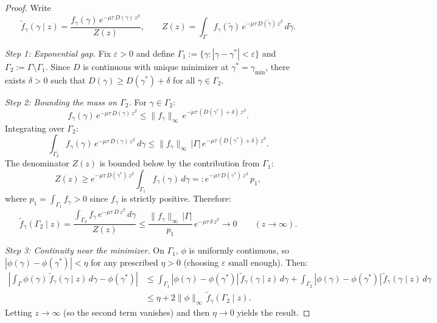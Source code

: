 \documentclass[12pt,a4paper]{article}
\theoremstyle{definition}
\theoremstyle{plain}
\theoremstyle{remark}
\begin{document}
\begin{proof}
Write
\[
  \widetilde{f}_{\gamma}(\gamma \mid z) = \frac{f_{\gamma}(\gamma)\,e^{-\mu\tau\,D(\gamma)\,z^{\beta}}}{Z(z)}, \qquad Z(z) = \int_{\Gamma} f_{\gamma}(\tilde\gamma)\,e^{-\mu\tau\,D(\tilde\gamma)\,z^{\beta}}\,d\tilde\gamma.
\]

\emph{Step 1: Exponential gap.}  Fix $\varepsilon > 0$ and define $\Gamma_1 := \{\gamma : |\gamma - \gamma^*| < \varepsilon\}$ and $\Gamma_2 := \Gamma \setminus \Gamma_1$.  Since $D$ is continuous with unique minimizer at $\gamma^* = \gamma_{\min}$, there exists $\delta > 0$ such that $D(\gamma) \geq D(\gamma^*) + \delta$ for all $\gamma \in \Gamma_2$.

\emph{Step 2: Bounding the mass on $\Gamma_2$.}  For $\gamma \in \Gamma_2$:
\[
  f_{\gamma}(\gamma)\,e^{-\mu\tau\,D(\gamma)\,z^{\beta}} \leq \|f_{\gamma}\|_{\infty}\,e^{-\mu\tau\,(D(\gamma^*)+\delta)\,z^{\beta}}.
\]
Integrating over $\Gamma_2$:
\[
  \int_{\Gamma_2} f_{\gamma}(\gamma)\,e^{-\mu\tau\,D(\gamma)\,z^{\beta}}\,d\gamma \leq \|f_{\gamma}\|_{\infty}\,|\Gamma|\,e^{-\mu\tau\,(D(\gamma^*)+\delta)\,z^{\beta}}.
\]
The denominator $Z(z)$ is bounded below by the contribution from $\Gamma_1$:
\[
  Z(z) \geq e^{-\mu\tau\,D(\gamma^*)\,z^{\beta}}\int_{\Gamma_1} f_{\gamma}(\gamma)\,d\gamma =: e^{-\mu\tau\,D(\gamma^*)\,z^{\beta}}\,p_1,
\]
where $p_1 = \int_{\Gamma_1} f_{\gamma} > 0$ since $f_{\gamma}$ is strictly positive.  Therefore:
\[
  \widetilde{f}_{\gamma}(\Gamma_2 \mid z) = \frac{\int_{\Gamma_2} f_{\gamma}\,e^{-\mu\tau\,D\,z^{\beta}}\,d\gamma}{Z(z)} \leq \frac{\|f_{\gamma}\|_{\infty}\,|\Gamma|}{p_1}\,e^{-\mu\tau\,\delta\,z^{\beta}} \to 0 \qquad (z \to \infty).
\]

\emph{Step 3: Continuity near the minimizer.}  On $\Gamma_1$, $\phi$ is uniformly continuous, so $|\phi(\gamma) - \phi(\gamma^*)| < \eta$ for any prescribed $\eta > 0$ (choosing $\varepsilon$ small enough).  Then:
\begin{align*}
  \left|\int_{\Gamma} \phi(\gamma)\,\widetilde{f}_{\gamma}(\gamma \mid z)\,d\gamma - \phi(\gamma^*)\right|
  &\leq \int_{\Gamma_1} |\phi(\gamma) - \phi(\gamma^*)|\,\widetilde{f}_{\gamma}(\gamma \mid z)\,d\gamma + \int_{\Gamma_2} |\phi(\gamma) - \phi(\gamma^*)|\,\widetilde{f}_{\gamma}(\gamma \mid z)\,d\gamma \\
  &\leq \eta + 2\|\phi\|_{\infty}\,\widetilde{f}_{\gamma}(\Gamma_2 \mid z).
\end{align*}
Letting $z \to \infty$ (so the second term vanishes) and then $\eta \to 0$ yields the result.
\end{proof}
\end{document}

